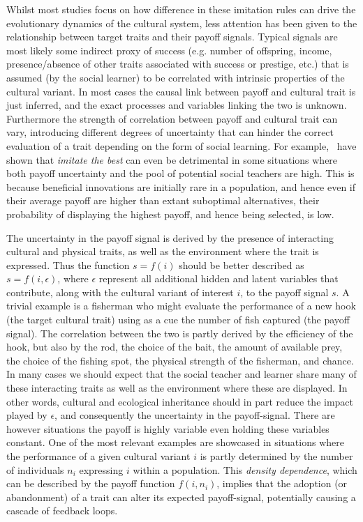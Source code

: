 \documentclass[review,authoryear]{elsarticle}
\begin{document}
Whilst most studies focus on how difference in these imitation rules can drive the evolutionary dynamics of the cultural system, less attention has been given to the relationship between target traits and their payoff signals. Typical signals are most likely some indirect proxy of success (e.g. number of offspring, income, presence/absence of other traits associated with success or prestige, etc.)  that is assumed (by the social learner) to be correlated with intrinsic properties of the cultural variant. In most cases the causal link between  payoff and cultural trait is just inferred, and the exact processes and variables linking the two is unknown. Furthermore the strength of correlation between payoff and cultural trait can vary, introducing different degrees of uncertainty that can hinder the correct evaluation of a trait depending on the form of social learning. For example,~\citet{crema_lake_inpress} have shown that \emph{imitate the best} can even be detrimental in some situations where both payoff uncertainty  and the pool of potential social teachers are high.  This is because beneficial innovations are initially rare in a population, and hence even if their average payoff are higher than extant suboptimal alternatives, their probability of displaying the highest payoff, and hence being selected, is low.

The uncertainty in the payoff signal is derived by the presence of interacting cultural and physical traits, as well as the environment where the trait is expressed. Thus the function $s=f(i)$ should be better described as $s=f(i,\epsilon)$, where $\epsilon$ represent all additional hidden and latent variables that contribute, along with the cultural variant of interest $i$, to the payoff signal $s$. A trivial example is a fisherman who might evaluate the performance of a new hook (the target cultural trait) using as a cue the number of fish captured (the payoff signal). The correlation between the two is partly derived by the efficiency of the hook, but also by the rod, the choice of the bait, the amount of available prey, the choice of the fishing spot, the physical strength of the fisherman, and chance. In many cases we should expect that the social teacher and learner share many of these interacting traits as well as the environment where these are displayed. In other words, cultural and ecological inheritance should in part reduce the impact played by $\epsilon$, and consequently the uncertainty in the payoff-signal. There are however situations the payoff is highly variable even holding these variables constant. One of the most relevant examples are showcased in situations where the performance of a given  cultural variant $i$ is partly determined by the number of individuals $n_i$ expressing $i$ within a population. This \emph{density dependence}, which can be described by the payoff function $f(i,n_i)$, implies that the adoption (or abandonment) of a trait can alter its expected payoff-signal, potentially causing a cascade of feedback loops.  
\end{document}
